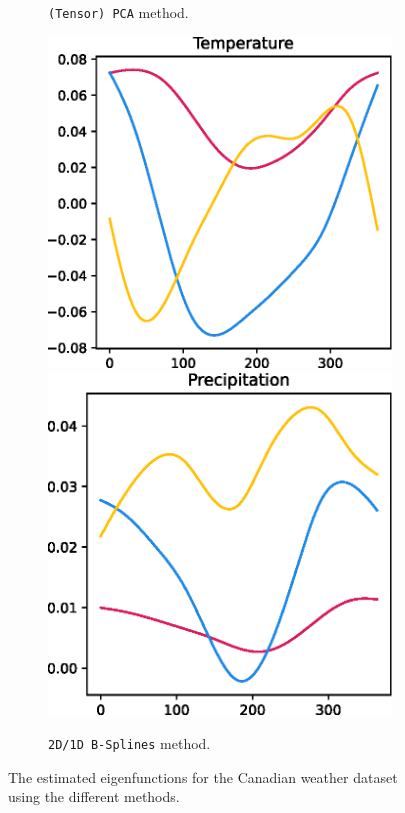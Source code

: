 \begin{figure}
\begin{subfigure}[b]{0.3\textwidth}
    \caption{\texttt{(Tensor) PCA} method.}
    \end{subfigure}
    \hfill
    \begin{subfigure}[b]{0.3\textwidth}
    \centering
    \includegraphics[width=\textwidth]{eigen_temp_psplines.eps}
    \includegraphics[width=\textwidth]{eigen_prec_psplines.eps}
    \caption{\texttt{2D/1D B-Splines} method.}
    \end{subfigure}
    \caption{The estimated eigenfunctions for the Canadian weather dataset using the different methods.}
    \label{fig:canadian_weather_eigenfunctions}
\end{figure}


